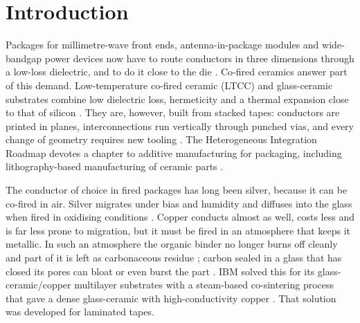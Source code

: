 \section{Introduction}
\label{sec:intro}

Packages for millimetre-wave front ends, antenna-in-package modules and wide-bandgap power devices now have to route conductors in three dimensions through a low-loss dielectric, and to do it close to the die \cite{lau2022advanced,watanabe2021review,zhang2019antenna,chen2017sic}. Co-fired ceramics answer part of this demand. Low-temperature co-fired ceramic (LTCC) and glass-ceramic substrates combine low dielectric loss, hermeticity and a thermal expansion close to that of silicon \cite{sebastian2008low,tummala1991ceramic}. They are, however, built from stacked tapes: conductors are printed in planes, interconnections run vertically through punched vias, and every change of geometry requires new tooling \cite{imanaka2005multilayered,sebastian2008low}. The Heterogeneous Integration Roadmap devotes a chapter to additive manufacturing for packaging, including lithography-based manufacturing of ceramic parts \cite{ieeeeps2024hir}.

The conductor of choice in fired packages has long been silver, because it can be co-fired in air. Silver migrates under bias and humidity and diffuses into the glass when fired in oxidising conditions \cite{yang2007failure,jean2004interfacial,ma2016suppression}. Copper conducts almost as well, costs less and is far less prone to migration, but it must be fired in an atmosphere that keeps it metallic. In such an atmosphere the organic binder no longer burns off cleanly and part of it is left as carbonaceous residue \cite{lewis1997binder}; carbon sealed in a glass that has closed its pores can bloat or even burst the part \cite{herron1980method}. IBM solved this for its glass-ceramic/copper multilayer substrates with a steam-based co-sintering process that gave a dense glass-ceramic with high-conductivity copper \cite{master1991cosintering,tummala1991ceramic}. That solution was developed for laminated tapes.

